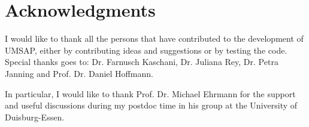 \newpage

\section{Acknowledgments}

I would like to thank all the persons that have contributed to the development of UMSAP, either by contributing ideas and suggestions or by testing the code. Special thanks goes to: Dr. Farnusch Kaschani, Dr. Juliana Rey, Dr. Petra Janning and Prof. Dr. Daniel Hoffmann.

In particular, I would like to thank Prof. Dr. Michael Ehrmann for the support and useful discussions during my postdoc time in his group at the University of Duisburg-Essen. 

